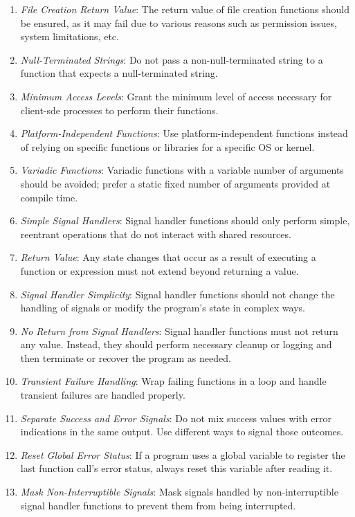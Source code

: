 \documentclass[9pt]{IEEEtran} %
\begin{document}
\begin{enumerate}
  \item \textit{File Creation Return Value}: The return value of file creation functions should be ensured, as it may fail due to various reasons such as permission issues, system limitations, etc.
  \item \textit{Null-Terminated Strings}: Do not pass a non-null-terminated string to a function that expects a null-terminated string.
  \item \textit{Minimum Access Levels}: Grant the minimum level of access necessary for client-sde processes to perform their functions.
  \item \textit{Platform-Independent Functions}: Use platform-independent functions instead of relying on specific functions or libraries for a specific OS or kernel.
  \item \textit{Variadic Functions}: Variadic functions with a variable number of arguments should be avoided; prefer a static fixed number of arguments provided at compile time.
  \item \textit{Simple Signal Handlers}: Signal handler functions should only perform simple, reentrant operations that do not interact with shared resources.
  \item \textit{Return Value}: Any state changes that occur as a result of executing a function or expression must not extend beyond returning a value.
  \item \textit{Signal Handler Simplicity}: Signal handler functions should not change the handling of signals or modify the program's state in complex ways.
  \item \textit{No Return from Signal Handlers}: Signal handler functions must not return any value. Instead, they should perform necessary cleanup or logging and then terminate or recover the program as needed.
  \item \textit{Transient Failure Handling}: Wrap failing functions in a loop and handle transient failures are handled properly.
  \item \textit{Separate Success and Error Signals}: Do not mix success values with error indications in the same output. Use different ways to signal those outcomes.
  \item \textit{Reset Global Error Status}: If a program uses a global variable to register the last function call's error status, always reset this variable after reading it.
  \item \textit{Mask Non-Interruptible Signals}: Mask signals handled by non-interruptible signal handler functions to prevent them from being interrupted.

\end{enumerate}
\end{document}
